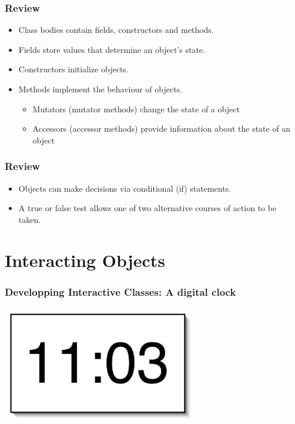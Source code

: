 \documentclass{beamer}
\begin{document}
\begin{frame}
\frametitle{Review}
\begin{itemize}
\item Class bodies contain fields, constructors and methods.
\item Fields store values that determine an object’s state.
\item Constructors initialize objects.
\item Methods implement the behaviour of objects.
\begin{itemize}
\item Mutators (mutator methods) change the state of a object
\item Accessors (accessor methods) provide information about the state of an object 
\end{itemize}
\end{itemize}
\end{frame}

\begin{frame}
\frametitle{Review}
\begin{itemize}
\item Objects can make decisions via conditional (if) statements.
\item A true or false test allows one of two alternative courses of action to be taken.
\end{itemize}
\end{frame}

\section{Interacting Objects}

\begin{frame}
\frametitle{Developping Interactive Classes: A digital clock}
\begin{center}
\includegraphics[height=5cm,keepaspectratio]{./figures/clock}
\end{center}
\end{frame}
\end{document}
